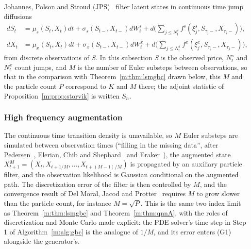 Johannes, Polson and Stroud (JPS)~\cite{jps2009} filter latent states in continuous time jump diffusions
\begin{align}
dS_t&=\mu_s(S_t,X_t)dt+\sigma_s(S_{t-},X_{t-})dW^s_t+d\Big(\sum_{j\le N^s_t}f^s(\xi^s_j,S_{\tau_j-},X_{\tau_j-})\Big),\label{m:eq:jd1}\\
dX_t&=\mu_x(S_t,X_t)dt+\sigma_x(S_{t-},X_{t-})dW^x_t+d\Big(\sum_{j\le N^x_t}f^x(\xi^x_j,S_{\tau_j-},X_{\tau_j-})\Big),\label{m:eq:jd2}
\end{align}
from discrete observations of $S$. In this subsection $S$ is the observed price, $N^s_t$ and $N^x_t$ count jumps, and $M$ is the number of Euler substeps between observations, so that in the comparison with Theorem~\ref{m:thm:lsmgbc} drawn below, this $M$ and the particle count $P$ correspond to $K$ and $M$ there; the adjoint statistic of Proposition~\ref{m:prop:storvik} is written $S_n$.

\subsubsection{High frequency augmentation} The continuous time transition density is unavailable, so $M$ Euler substeps are simulated between observation times (``filling in the missing data'', after Pedersen~\cite{pedersen1995}, Elerian, Chib and Shephard~\cite{elerian2001} and Eraker~\cite{eraker2001}), the augmented state $X^M_{t+1}=(X_t,X_{t+1/M},\dots,X_{t+(M-1)/M})$ is propagated by an auxiliary particle filter, and the observation likelihood is Gaussian conditional on the augmented path. The discretization error of the filter is then controlled by $M$, and the convergence result of Del Moral, Jacod and Protter~\cite{delmoral2001} requires $M$ to grow slower than the particle count, for instance $M=\sqrt P$. This is the same two index limit as Theorem~\ref{m:thm:lsmgbc} and Theorem~\ref{m:thm:qnnA}, with the roles of discretization and Monte Carlo made explicit: the PDE solver's time step in Step 1 of Algorithm~\ref{m:alg:gbc} is the analogue of $1/M$, and its error enters (G1) alongside the generator's.

